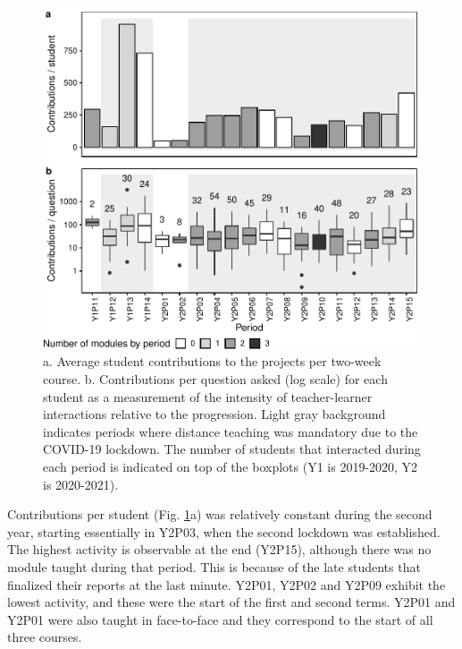 \documentclass{aims} %
\theoremstyle{definition}
\begin{document}
\begin{figure}
\includegraphics[width=1\linewidth]{teaching_data_science_files/figure-latex/fig_support_by_time-1} \caption{\label{fig:fig_support_by_time} a. Average student contributions to the projects per two-week course. b. Contributions per question asked (log scale) for each student as a measurement of the intensity of teacher-learner interactions relative to the progression. Light gray background indicates periods where distance teaching was mandatory due to the COVID-19 lockdown. The number of students that interacted during each period is indicated on top of the boxplots (Y1 is 2019-2020, Y2 is 2020-2021).}\label{fig:fig_support_by_time}
\end{figure}

Contributions per student (Fig. \ref {fig:fig_support_by_time}a) was
relatively constant during the second year, starting essentially in
Y2P03, when the second lockdown was established. The highest activity is
observable at the end (Y2P15), although there was no module taught
during that period. This is because of the late students that finalized
their reports at the last minute. Y2P01, Y2P02 and Y2P09 exhibit the
lowest activity, and these were the start of the first and second terms.
Y2P01 and Y2P01 were also taught in face-to-face and they correspond to
the start of all three courses.
\end{document}
